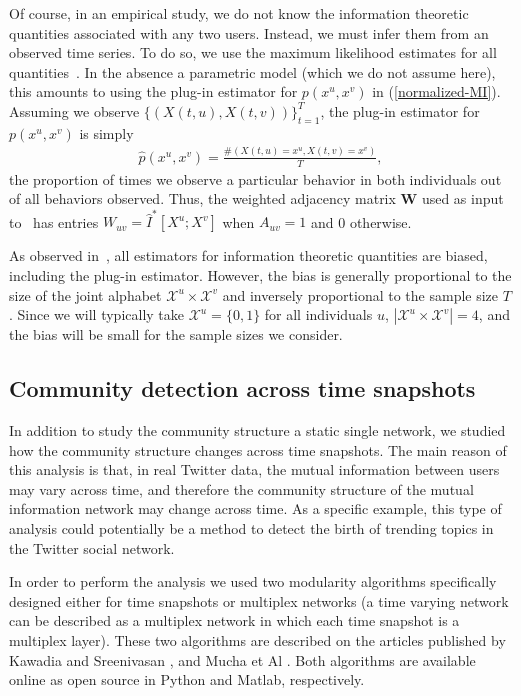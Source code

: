 \documentclass[12pt]{article}
\begin{document}
Of course, in an empirical study, we do not know the information theoretic quantities associated with any two users. Instead, we must infer them from an observed time series. To do so, we use the maximum likelihood estimates for all quantities~\cite{paninski2003estimation}. In the absence a parametric model (which we do not assume here), this amounts to using the plug-in estimator for $p(x^{u}, x^{v})$ in (\ref{normalized-MI}). Assuming we observe $\{ (X(t, u), X(t, v)) \}_{t = 1}^{T}$, the plug-in estimator for $p(x^{u}, x^{v})$ is simply
\begin{align}
	\hat{p}(x^{u}, x^{v}) = \frac{\#(X(t, u) = x^{u}, X(t, v) = x^{v})}{T},
\end{align}
the proportion of times we observe a particular behavior in both individuals out of all behaviors observed. Thus, the weighted adjacency matrix $\mathbf{W}$ used as input to~\cite{blondel2008fast} has entries $W_{uv} = \hat{I}^{*}[X^{u}; X^{v}]$ when $A_{uv} = 1$ and 0 otherwise.

As observed in~\cite{paninski2003estimation}, all estimators for information theoretic quantities are biased, including the plug-in estimator. However, the bias is generally proportional to the size of the joint alphabet $\mathcal{X}^{u} \times \mathcal{X}^{v}$ and inversely proportional to the sample size $T$. Since we will typically take $\mathcal{X}^{u} = \{0, 1\}$ for all individuals $u$, $|\mathcal{X}^{u} \times \mathcal{X}^{v}| = 4$, and the bias will be small for the sample sizes we consider.

\subsection{Community detection across time snapshots}

In addition to study the community structure a static single network, we studied how the community structure changes across time snapshots. The main reason of this analysis is that, in real Twitter data,  the mutual information between users may vary across time, and therefore the community structure of the mutual information network may change across time. As
a specific example, this type of analysis could potentially be a method to detect the birth of trending topics in the Twitter social network.

In order to perform the analysis we used two modularity algorithms
specifically designed either for time snapshots or multiplex networks (a time varying network
can be described as a multiplex network in which each time snapshot is a multiplex layer).
These two algorithms are described on the articles published by Kawadia and Sreenivasan
\cite{kawadia2012sequential}, and Mucha et Al \cite{Mucha14052010}. Both algorithms are available
online as open source in Python and Matlab, respectively. 
\end{document}
